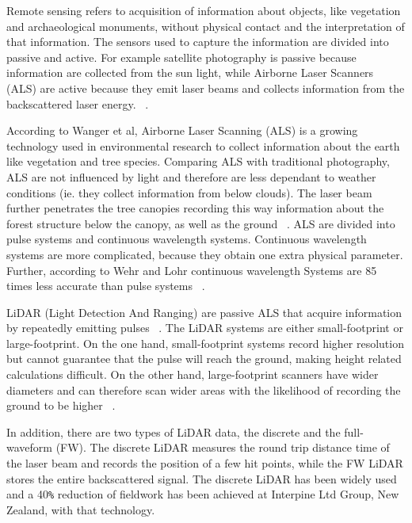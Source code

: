 \documentclass{subfiles}
\begin{document}
	\par Remote sensing refers to acquisition of information about objects, like vegetation and archaeological monuments, without physical contact and the interpretation of that information.  The sensors used to capture the information are divided into passive and active. For example satellite photography is passive because information are collected from the sun light, while Airborne Laser Scanners (ALS) are active because they emit laser beams and collects information from the backscattered laser energy. ~\cite{Smith2012}.
	
	\par According to Wanger et al, Airborne Laser Scanning (ALS) is a growing technology used in environmental research to collect information about the earth like vegetation and tree species. Comparing ALS with traditional photography, ALS are not influenced by light and therefore are less dependant to weather conditions (ie. they collect information from below clouds). The laser beam further penetrates the tree canopies recording this way information about the forest structure below the canopy, as well as the ground ~\cite{Wanger2004}. ALS are divided into pulse systems and continuous wavelength systems. Continuous wavelength systems are more complicated, because they obtain one extra physical parameter. Further, according to Wehr and Lohr continuous wavelength Systems are 85 times less accurate than pulse systems ~\cite{Wehr1999}.
	
	\par LiDAR (Light Detection And Ranging) are passive ALS that acquire information by repeatedly emitting pulses ~\cite{Wehr1999}. The LiDAR systems are either small-footprint or large-footprint. On the one hand, small-footprint systems record higher resolution but cannot guarantee that the pulse will reach the ground, making height related calculations difficult. On the other hand, large-footprint scanners have wider diameters and can therefore scan wider areas with the likelihood of recording the ground to be higher ~\cite{Mallet2009}. 
	
	\par In addition, there are two types of LiDAR data, the discrete and the full-waveform (FW). The discrete LiDAR measures the round trip distance time of the laser beam and records the position of a few hit points, while the FW LiDAR stores the entire backscattered signal. The discrete LiDAR has been widely used and a 40\verb|%| reduction of fieldwork has been achieved at Interpine Ltd Group, New Zealand, with that technology. 
	
\end{document}
